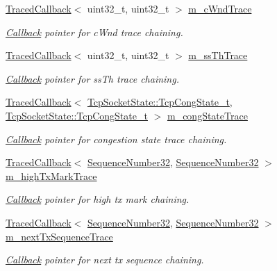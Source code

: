 \begin{DoxyCompactItemize}
\item 
\hyperlink{classns3_1_1TracedCallback}{Traced\+Callback}$<$ uint32\+\_\+t, uint32\+\_\+t $>$ \hyperlink{classns3_1_1TcpSocketBase_a53183f9cee6315bcb73742b9b9d14970}{m\+\_\+c\+Wnd\+Trace}
\begin{DoxyCompactList}\small\item\em \hyperlink{classns3_1_1Callback}{Callback} pointer for c\+Wnd trace chaining. \end{DoxyCompactList}\item 
\hyperlink{classns3_1_1TracedCallback}{Traced\+Callback}$<$ uint32\+\_\+t, uint32\+\_\+t $>$ \hyperlink{classns3_1_1TcpSocketBase_aba33c4aa346eeb1a205a97844d8ed689}{m\+\_\+ss\+Th\+Trace}
\begin{DoxyCompactList}\small\item\em \hyperlink{classns3_1_1Callback}{Callback} pointer for ss\+Th trace chaining. \end{DoxyCompactList}\item 
\hyperlink{classns3_1_1TracedCallback}{Traced\+Callback}$<$ \hyperlink{classns3_1_1TcpSocketState_a6fc313945a33d48fd60cbffe0c787b19}{Tcp\+Socket\+State\+::\+Tcp\+Cong\+State\+\_\+t}, \hyperlink{classns3_1_1TcpSocketState_a6fc313945a33d48fd60cbffe0c787b19}{Tcp\+Socket\+State\+::\+Tcp\+Cong\+State\+\_\+t} $>$ \hyperlink{classns3_1_1TcpSocketBase_a682c31efa86a22cbffae1f4ba7c0bbc4}{m\+\_\+cong\+State\+Trace}
\begin{DoxyCompactList}\small\item\em \hyperlink{classns3_1_1Callback}{Callback} pointer for congestion state trace chaining. \end{DoxyCompactList}\item 
\hyperlink{classns3_1_1TracedCallback}{Traced\+Callback}$<$ \hyperlink{group__network_gacb2070e4e98d2d5135c9bede58f07a03}{Sequence\+Number32}, \hyperlink{group__network_gacb2070e4e98d2d5135c9bede58f07a03}{Sequence\+Number32} $>$ \hyperlink{classns3_1_1TcpSocketBase_abe31167cc73bc1917e616aa210fa1041}{m\+\_\+high\+Tx\+Mark\+Trace}
\begin{DoxyCompactList}\small\item\em \hyperlink{classns3_1_1Callback}{Callback} pointer for high tx mark chaining. \end{DoxyCompactList}\item 
\hyperlink{classns3_1_1TracedCallback}{Traced\+Callback}$<$ \hyperlink{group__network_gacb2070e4e98d2d5135c9bede58f07a03}{Sequence\+Number32}, \hyperlink{group__network_gacb2070e4e98d2d5135c9bede58f07a03}{Sequence\+Number32} $>$ \hyperlink{classns3_1_1TcpSocketBase_a4f6e09e3f0132fbf82af53bcd9c49acc}{m\+\_\+next\+Tx\+Sequence\+Trace}
\begin{DoxyCompactList}\small\item\em \hyperlink{classns3_1_1Callback}{Callback} pointer for next tx sequence chaining. \end{DoxyCompactList}\end{DoxyCompactItemize}
